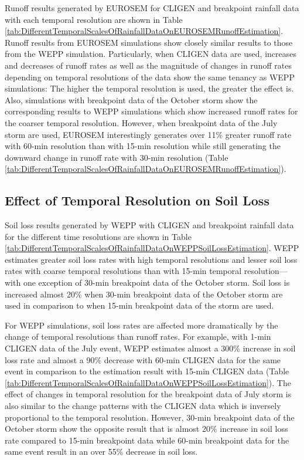 Runoff results generated by EUROSEM for CLIGEN and breakpoint rainfall data with
each temporal resolution are shown in Table
\ref{tab:DifferentTemporalScalesOfRainfallDataOnEUROSEMRunoffEstimation}. Runoff
results from EUROSEM simulations show closely similar results to those from the
WEPP simulation. Particularly, when CLIGEN data are used, increases and
decreases of runoff rates as well as the magnitude of changes in runoff
rates depending on temporal resolutions of the data show the same tenancy as
WEPP
simulations: The higher the temporal resolution is used, the greater the effect
is.
Also, simulations with breakpoint data of the October storm show the
corresponding results to WEPP simulations which show increased runoff rates for
the coarser temporal resolution. However, when breakpoint data of the July storm
are
used, EUROSEM interestingly generates over 11\% greater runoff rate with 60-min
resolution than with 15-min resolution while still generating the downward
change in
runoff rate with 30-min resolution (Table
\ref{tab:DifferentTemporalScalesOfRainfallDataOnEUROSEMRunoffEstimation}).

\subsection{Effect of Temporal Resolution on Soil Loss}
\label{sec:TemporalScalesSimulatedSoilLoss}

Soil loss results generated by WEPP with CLIGEN and breakpoint rainfall data for
the different time resolutions are shown in Table
\ref{tab:DifferentTemporalScalesOfRainfallDataOnWEPPSoilLossEstimation}. WEPP
estimates greater soil loss rates with high temporal resolutions and lesser soil
loss
rates with coarse temporal resolutions than with 15-min temporal
resolution---with one
exception of 30-min breakpoint data of the October storm. Soil loss is increased
almost 20\% when 30-min breakpoint data of the October storm are used in
comparison to when 15-min breakpoint data of the storm are used.

For WEPP simulations, soil loss rates are affected more dramatically by the
change of temporal resolutions than runoff rates. For example, with 1-min CLIGEN
data
of the July event, WEPP estimates almost a 300\% increase in soil loss rate and
almost a 90\% decrease with 60-min CLIGEN data for the same event in comparison
to the estimation result with 15-min CLIGEN data (Table
\ref{tab:DifferentTemporalScalesOfRainfallDataOnWEPPSoilLossEstimation}). The
effect of changes in temporal resolution for the breakpoint data of July storm
is also similar to the change patterns with the CLIGEN data which is inversely
proportional to the temporal resolution. However, 30-min breakpoint data of the
October storm show the opposite result that is almost 20\% increase in soil loss
rate compared to 15-min breakpoint data while 60-min breakpoint data for the
same event result in an over 55\% decrease in soil loss.

